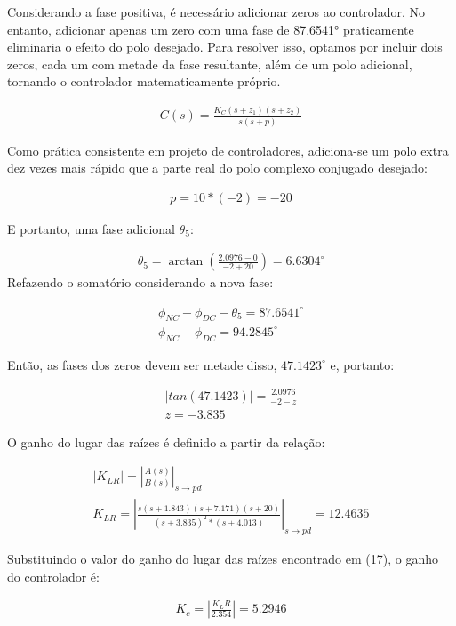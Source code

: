 \documentclass[a4paper,12pt]{article}
\begin{document}
Considerando a fase positiva, é necessário adicionar zeros ao controlador. No entanto, adicionar apenas um zero com uma fase de 87.6541° praticamente eliminaria o efeito do polo desejado. Para resolver isso, optamos por incluir dois zeros, cada um com metade da fase resultante, além de um polo adicional, tornando o controlador matematicamente próprio.

\begin{align}
C(s) = \frac{K_C(s + z_1)(s + z_2)}{s(s + p)}
\end{align}

Como prática consistente em projeto de controladores, adiciona-se um polo extra dez vezes mais rápido que a parte real do polo complexo conjugado desejado:

\begin{align}
p = 10*(-2) = -20
\end{align}

E portanto, uma fase adicional $\theta_5$:

\begin{align}
\theta_5 = \arctan(\frac{2.0976-0 }{-2+20})  = 6.6304^\circ
\end{align}
 Refazendo o somatório considerando a nova fase:
 
 \begin{align}
 \phi_{NC}-\phi_{DC}-\theta_5=87.6541^\circ\\
 \phi_{NC}-\phi_{DC}=94.2845^\circ
 \end{align}

 Então, as fases dos zeros devem ser metade disso, $47.1423^\circ$ e, portanto:

 \begin{align}
     |tan(47.1423)|=\frac{2.0976}{-2-z}\\
     z = -3.835
 \end{align}

 O ganho do lugar das raízes é definido a partir da relação:

 \begin{align}
|K_{LR}|= \left|\frac{A(s)}{B(s)}\right|_{s\rightarrow pd}\\
K_{LR} = \left|\frac{s(s+1.843)(s+7.171)(s+20)}{(s+3.835)^2*(s+4.013)}  \right|_{s\rightarrow pd} = 12.4635
 \end{align}

 Substituindo o valor do ganho do lugar das raízes encontrado em (17), o ganho do controlador é:

 \begin{align}
     K_c = \left|\frac{K_LR}{2.354}  \right|= 5.2946
 \end{align}
\end{document}
